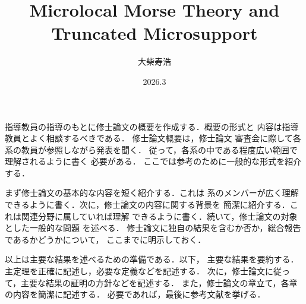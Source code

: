 ﻿\documentclass[a4paper]{jsarticle}
\title{Microlocal Morse Theory and Truncated Microsupport}
\author{大柴寿浩}
\date{2026.3} %
\begin{document}
\begin{gaiyo}
  指導教員の指導のもとに修士論文の概要を作成する．概要の形式と
  内容は指導教員とよく相談するべきである．
  修士論文概要は，修士論文
  審査会に際して各系の教員が参照しながら発表を聞く．
  従って，各系の中である程度広い範囲で理解されるように書く
  必要がある．
  ここでは参考のために一般的な形式を紹介する．

  まず修士論文の基本的な内容を短く紹介する．これは
  系のメンバーが広く理解できるように書く．次に，修士論文の内容に関する背景を
  簡潔に紹介する．これは関連分野に属していれば理解
  できるように書く．続いて，修士論文の対象とした一般的な問題
  を述べる．
  修士論文に独自の結果を含むか否か，総合報告であるかどうかについて，
  ここまでに明示しておく．

  以上は主要な結果を述べるための準備である．以下，
  主要な結果を要約する．主定理を正確に記述し，必要な定義などを記述する．
  次に，修士論文に従って，主要な結果の証明の方針などを記述する．
  また，修士論文の章立て，各章の内容を簡潔に記述する．
  必要であれば，最後に参考文献を挙げる．
\end{gaiyo}
\end{document}
